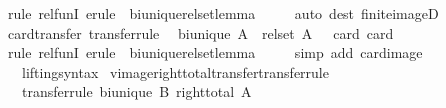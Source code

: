 \begin{isabellebody}
%
\isatagproof
{}\isamarkupfalse%
\ {\isacharparenleft}{\kern0pt}rule\ rel{\isacharunderscore}{\kern0pt}funI{\isacharcomma}{\kern0pt}\ erule\ {\isacharparenleft}{\kern0pt}{}{\isacharparenright}{\kern0pt}\ bi{\isacharunderscore}{\kern0pt}unique{\isacharunderscore}{\kern0pt}rel{\isacharunderscore}{\kern0pt}set{\isacharunderscore}{\kern0pt}lemma{\isacharparenright}{\kern0pt}\isanewline
\ \ \ \ \ {\isacharparenleft}{\kern0pt}auto\ dest{\isacharcolon}{\kern0pt}\ finite{\isacharunderscore}{\kern0pt}imageD{\isacharparenright}{\kern0pt}%
\endisatagproof
{\isafoldproof}%
%
\isadelimproof
\isanewline
%
\endisadelimproof
\isanewline
{}\isamarkupfalse%
\ card{\isacharunderscore}{\kern0pt}transfer\ {\isacharbrackleft}{\kern0pt}transfer{\isacharunderscore}{\kern0pt}rule{\isacharbrackright}{\kern0pt}{\isacharcolon}{\kern0pt}\isanewline
\ \ {\isachardoublequoteopen}bi{\isacharunderscore}{\kern0pt}unique\ A\ {\isasymLongrightarrow}\ {\isacharparenleft}{\kern0pt}rel{\isacharunderscore}{\kern0pt}set\ A\ {\isacharequal}{\kern0pt}{\isacharequal}{\kern0pt}{\isacharequal}{\kern0pt}{\isachargreater}{\kern0pt}\ {\isacharparenleft}{\kern0pt}{\isacharequal}{\kern0pt}{\isacharparenright}{\kern0pt}{\isacharparenright}{\kern0pt}\ card\ card{\isachardoublequoteclose}\isanewline
%
\isadelimproof
\ \ %
\endisadelimproof
%
\isatagproof
{}\isamarkupfalse%
\ {\isacharparenleft}{\kern0pt}rule\ rel{\isacharunderscore}{\kern0pt}funI{\isacharcomma}{\kern0pt}\ erule\ {\isacharparenleft}{\kern0pt}{}{\isacharparenright}{\kern0pt}\ bi{\isacharunderscore}{\kern0pt}unique{\isacharunderscore}{\kern0pt}rel{\isacharunderscore}{\kern0pt}set{\isacharunderscore}{\kern0pt}lemma{\isacharparenright}{\kern0pt}\isanewline
\ \ \ \ \ {\isacharparenleft}{\kern0pt}simp\ add{\isacharcolon}{\kern0pt}\ card{\isacharunderscore}{\kern0pt}image{\isacharparenright}{\kern0pt}%
\endisatagproof
{\isafoldproof}%
%
\isadelimproof
\isanewline
%
\endisadelimproof
\isanewline
{}\isamarkupfalse%
\isanewline
\ \ \ lifting{\isacharunderscore}{\kern0pt}syntax\isanewline
{}\isanewline
\isanewline
{}\isamarkupfalse%
\ vimage{\isacharunderscore}{\kern0pt}right{\isacharunderscore}{\kern0pt}total{\isacharunderscore}{\kern0pt}transfer{\isacharbrackleft}{\kern0pt}transfer{\isacharunderscore}{\kern0pt}rule{\isacharbrackright}{\kern0pt}{\isacharcolon}{\kern0pt}\isanewline
\ \ \ {\isacharbrackleft}{\kern0pt}transfer{\isacharunderscore}{\kern0pt}rule{\isacharbrackright}{\kern0pt}{\isacharcolon}{\kern0pt}\ {\isachardoublequoteopen}bi{\isacharunderscore}{\kern0pt}unique\ B{\isachardoublequoteclose}\ {\isachardoublequoteopen}right{\isacharunderscore}{\kern0pt}total\ A{\isachardoublequoteclose}\isanewline

\end{isabellebody}
